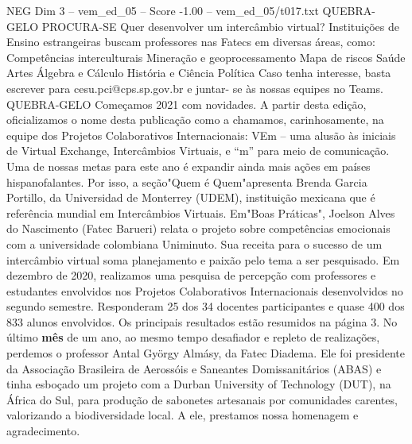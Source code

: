 \begin{textsample}{NEG Dim 3 – vem\_ed\_05 – Score -1.00 – vem\_ed\_05/t017.txt}  \label{ex:f3_neg_057}
QUEBRA-GELO PROCURA-SE Quer desenvolver um intercâmbio virtual?
Instituições de Ensino estrangeiras buscam professores nas Fatecs em diversas áreas, como: Competências interculturais Mineração e geoprocessamento Mapa de riscos Saúde Artes Álgebra e Cálculo História e Ciência Política Caso tenha interesse, basta escrever para cesu.pci@cps.sp.gov.br e juntar- se às nossas equipes no Teams.
QUEBRA-GELO Começamos 2021 com novidades.
A partir desta edição, oficializamos o nome desta publicação como a chamamos, carinhosamente, na equipe dos Projetos Colaborativos Internacionais: VEm – uma alusão às iniciais de Virtual Exchange, Intercâmbios Virtuais, e “m” para meio de comunicação.
Uma de nossas metas para este ano é expandir ainda mais ações em países hispanofalantes.
Por isso, a seção"Quem é Quem"apresenta Brenda Garcia Portillo, da Universidad de Monterrey (UDEM), instituição mexicana que é referência mundial em Intercâmbios Virtuais.
Em"Boas Práticas", Joelson Alves do Nascimento (Fatec Barueri) relata o projeto sobre competências emocionais com a universidade colombiana Uniminuto.
Sua receita para o sucesso de um intercâmbio virtual soma planejamento e paixão pelo tema a ser pesquisado.
Em dezembro de 2020, realizamos uma pesquisa de percepção com professores e estudantes envolvidos nos Projetos Colaborativos Internacionais desenvolvidos no segundo semestre.
Responderam 25 dos 34 docentes participantes e quase 400 dos 833 alunos envolvidos.
Os principais resultados estão resumidos na página 3.
No último \textbf{mês} de um ano, ao mesmo tempo desafiador e repleto de realizações, perdemos o professor Antal György Almásy, da Fatec Diadema.
Ele foi presidente da Associação Brasileira de Aerossóis e Saneantes Domissanitários (ABAS) e tinha esboçado um projeto com a Durban University of Technology (DUT), na África do Sul, para produção de sabonetes artesanais por comunidades carentes, valorizando a biodiversidade local.
A ele, prestamos nossa homenagem e agradecimento.

\end{textsample}

